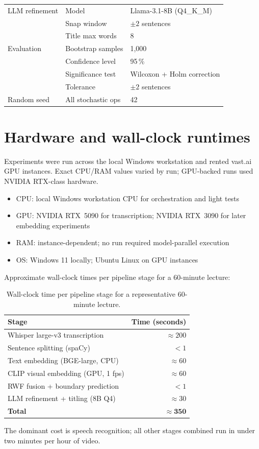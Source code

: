 \begin{table}[h]
\begin{tabular}{lll}
    LLM refinement & Model & Llama-3.1-8B (Q4\_K\_M) \\
                   & Snap window & $\pm 2$ sentences \\
                   & Title max words & 8 \\
    \midrule
    Evaluation & Bootstrap samples & 1{,}000 \\
               & Confidence level & 95\,\% \\
               & Significance test & Wilcoxon + Holm correction \\
               & Tolerance & $\pm 2$ sentences \\
    \midrule
    Random seed & All stochastic ops & 42 \\
    \bottomrule
  \end{tabular}
\end{table}

\section{Hardware and wall-clock runtimes}

Experiments were run across the local Windows workstation and rented vast.ai GPU
instances. Exact CPU/RAM values varied by run; GPU-backed runs used NVIDIA
RTX-class hardware.
\begin{itemize}
  \item CPU: local Windows workstation CPU for orchestration and light tests
  \item GPU: NVIDIA RTX~5090 for transcription; NVIDIA RTX~3090 for later embedding experiments
  \item RAM: instance-dependent; no run required model-parallel execution
  \item OS: Windows 11 locally; Ubuntu Linux on GPU instances
\end{itemize}

\noindent Approximate wall-clock times per pipeline stage for a 60-minute lecture:

\begin{table}[h]
  \centering
  \caption{Wall-clock time per pipeline stage for a representative 60-minute lecture.}
  \label{tab:runtimes}
  \begin{tabular}{lr}
    \toprule
    Stage & Time (seconds) \\
    \midrule
    Whisper large-v3 transcription & $\approx 200$ \\
    Sentence splitting (spaCy) & $< 1$ \\
    Text embedding (BGE-large, CPU) & $\approx 60$ \\
    CLIP visual embedding (GPU, 1 fps) & $\approx 60$ \\
    RWF fusion + boundary prediction & $< 1$ \\
    LLM refinement + titling (8B Q4) & $\approx 30$ \\
    \midrule
    \textbf{Total} & $\mathbf{\approx 350}$ \\
    \bottomrule
  \end{tabular}
\end{table}

\noindent The dominant cost is speech recognition; all other stages combined
run in under two minutes per hour of video.
